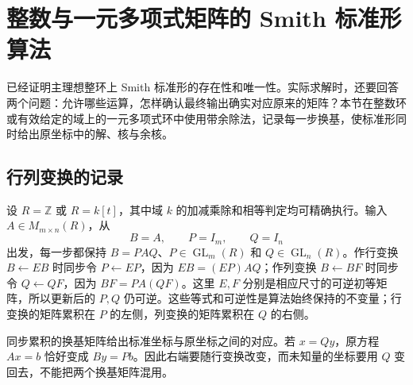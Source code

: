 
%
%

\section{整数与一元多项式矩阵的 Smith 标准形算法}
\label{b2:sec:A01}

已经证明主理想整环上 Smith 标准形的存在性和唯一性。实际求解时，还要回答两个问题：允许哪些运算，怎样确认最终输出确实对应原来的矩阵？本节在整数环或有效给定的域上的一元多项式环中使用带余除法，记录每一步换基，使标准形同时给出原坐标中的解、核与余核。

\subsection{行列变换的记录}
\label{b2:subsec:A01:01}

设 \(R=\mathbb Z\) 或 \(R=k[t]\)，其中域 \(k\) 的加减乘除和相等判定均可精确执行。输入 \(A\in M_{m\times n}(R)\)，从
\[
	B=A,\qquad P=I_m,\qquad Q=I_n
\]
出发，每一步都保持 \(B=PAQ\)、\(P\in\operatorname{GL}_m(R)\) 和 \(Q\in\operatorname{GL}_n(R)\)。作行变换 \(B\leftarrow EB\) 时同步令 \(P\leftarrow EP\)，因为 \(EB=(EP)AQ\)；作列变换 \(B\leftarrow BF\) 时同步令 \(Q\leftarrow QF\)，因为 \(BF=PA(QF)\)。这里 \(E,F\) 分别是相应尺寸的可逆初等矩阵，所以更新后的 \(P,Q\) 仍可逆。这些等式和可逆性是算法始终保持的不变量；行变换的矩阵累积在 \(P\) 的左侧，列变换的矩阵累积在 \(Q\) 的右侧。

\ProseParagraphBreak
同步累积的换基矩阵给出标准坐标与原坐标之间的对应。若 \(x=Qy\)，原方程 \(Ax=b\) 恰好变成 \(By=Pb\)。因此右端要随行变换改变，而未知量的坐标要用 \(Q\) 变回去，不能把两个换基矩阵混用。


